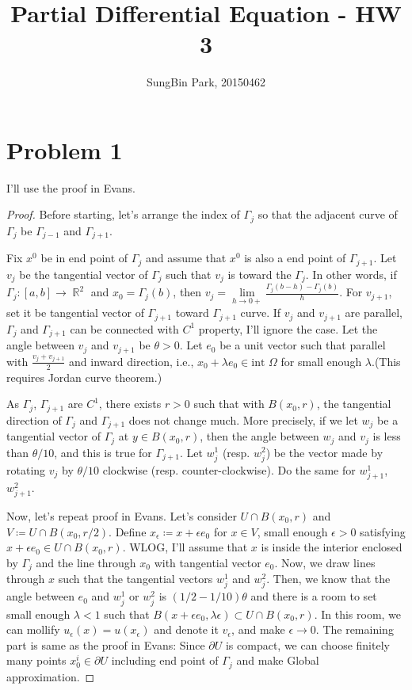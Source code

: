 \documentclass{article}
\DeclareMathOperator{\rr}{\mathbb{R}}
\begin{document}
\title{Partial Differential Equation - HW 3}
\author{SungBin Park, 20150462} 

 \maketitle

\section*{Problem 1}
I'll use the proof in Evans.
\begin{proof}
Before starting, let's arrange the index of $\Gamma_j$ so that the adjacent curve of $\Gamma_j$ be $\Gamma_{j-1}$ and $\Gamma_{j+1}$.

Fix $x^0$ be in end point of $\Gamma_j$ and assume that $x^0$ is also a end point of $\Gamma_{j+1}$. Let $v_{j}$ be the tangential vector of $\Gamma_j$ such that $v_j$ is toward the $\Gamma_j$. In other words, if $\Gamma_j:[a,b]\rightarrow \rr^2$ and $x_0=\Gamma_j(b)$, then $v_j=\lim\limits_{h\rightarrow 0+}\frac{\Gamma_j(b-h)-\Gamma_j(b)}{h}$. For $v_{j+1}$, set it be tangential vector of $\Gamma_{j+1}$ toward $\Gamma_{j+1}$ curve. If $v_{j}$ and $v_{j+1}$ are parallel, $\Gamma_j$ and $\Gamma_{j+1}$ can be connected with $C^1$ property, I'll ignore the case. Let the angle between $v_j$ and $v_{j+1}$ be $\theta>0$. Let $e_0$ be a unit vector such that parallel with $\frac{v_j+v_{j+1}}{2}$ and inward direction, i.e., $x_0+\lambda e_0\in \text{int }\Omega$ for small enough $\lambda$.(This requires Jordan curve theorem.)

As $\Gamma_j$, $\Gamma_{j+1}$ are $C^1$, there exists $r>0$ such that with $B(x_0, r)$, the tangential direction of $\Gamma_j$ and $\Gamma_{j+1}$ does not change much. More precisely, if we let $w_j$ be a tangential vector of $\Gamma_j$ at $y\in B(x_0, r)$, then the angle between $w_j$ and $v_j$ is less than $\theta/10$, and this is true for $\Gamma_{j+1}$. Let $w^1_j$ (resp. $w^2_j$) be the vector made by rotating $v_j$ by $\theta/10$ clockwise (resp. counter-clockwise). Do the same for $w^1_{j+1}$, $w^2_{j+1}$.

Now, let's repeat proof in Evans. Let's consider $U\cap B(x_0, r)$ and $V\coloneqq U\cap B(x_0, r/2)$. Define $x_\epsilon\coloneqq x+\epsilon e_0$ for $x\in V$, small enough $\epsilon>0$ satisfying $x+\epsilon e_0\in U\cap B(x_0, r)$. WLOG, I'll assume that $x$ is inside the interior enclosed by $\Gamma_j$ and the line through $x_0$ with tangential vector $e_0$. Now, we draw lines through $x$ such that the tangential vectors $w^1_j$ and $w^2_j$. Then, we know that the angle between $e_0$ and $w^1_j$ or $w^2_j$ is $(1/2-1/10)\theta$ and there is a room to set small enough $\lambda<1$ such that $B(x+\epsilon e_0, \lambda \epsilon)\subset U\cap B(x_0, r)$. In this room, we can mollify $u_\epsilon(x)=u(x_\epsilon)$ and denote it $v_\epsilon$, and make $\epsilon\rightarrow 0$. The remaining part is same as the proof in Evans: Since $\partial U$ is compact, we can choose finitely many points $x_0^i\in \partial U$ including end point of $\Gamma_j$ and make Global approximation.
\end{proof}
\end{document}
